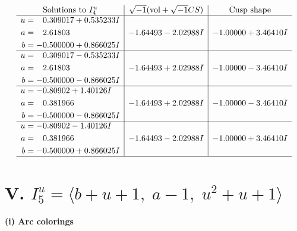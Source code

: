 \documentclass[1p]{elsarticle_modified}
\theoremstyle{definition}
\newcommand{\I}{\sqrt{-1}}
\begin{document}
$$\begin{array}{c|c|c}  
\text{Solutions to }I^u_{4}& \I (\text{vol} + \sqrt{-1}CS) & \text{Cusp shape}\\
 \hline 
\begin{aligned}
u &= \phantom{-}0.309017 + 0.535233 I \\
a &= \phantom{-}2.61803\phantom{ +0.000000I} \\
b &= -0.500000 + 0.866025 I\end{aligned}
 & -1.64493 - 2.02988 I & -1.00000 + 3.46410 I \\ \hline\begin{aligned}
u &= \phantom{-}0.309017 - 0.535233 I \\
a &= \phantom{-}2.61803\phantom{ +0.000000I} \\
b &= -0.500000 - 0.866025 I\end{aligned}
 & -1.64493 + 2.02988 I & -1.00000 - 3.46410 I \\ \hline\begin{aligned}
u &= -0.80902 + 1.40126 I \\
a &= \phantom{-}0.381966\phantom{ +0.000000I} \\
b &= -0.500000 - 0.866025 I\end{aligned}
 & -1.64493 + 2.02988 I & -1.00000 - 3.46410 I \\ \hline\begin{aligned}
u &= -0.80902 - 1.40126 I \\
a &= \phantom{-}0.381966\phantom{ +0.000000I} \\
b &= -0.500000 + 0.866025 I\end{aligned}
 & -1.64493 - 2.02988 I & -1.00000 + 3.46410 I\\
 \hline 
 \end{array}$$\newpage\newpage\renewcommand{\arraystretch}{1}
\centering \section*{V. $I^u_{5}= \langle b+u+1,\;a-1,\;u^2+u+1 \rangle$}
\flushleft \textbf{(i) Arc colorings}\\
\end{document}
